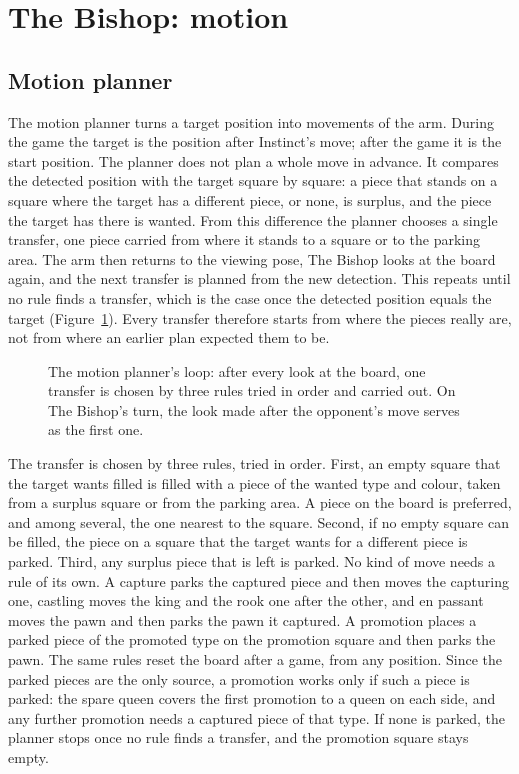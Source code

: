 \section{The Bishop: motion}
\label{sec:bishop-motion}

\subsection{Motion planner}
\label{subsec:motion-planner}

The motion planner turns a target position into movements of the arm.
During the game the target is the position after Instinct's move; after the game it is the start position.
The planner does not plan a whole move in advance.
It compares the detected position with the target square by square: a piece that stands on a square where the target has a different piece, or none, is surplus, and the piece the target has there is wanted.
From this difference the planner chooses a single transfer, one piece carried from where it stands to a square or to the parking area.
The arm then returns to the viewing pose, The Bishop looks at the board again, and the next transfer is planned from the new detection.
This repeats until no rule finds a transfer, which is the case once the detected position equals the target (Figure~\ref{fig:transfer-loop}).
Every transfer therefore starts from where the pieces really are, not from where an earlier plan expected them to be.

\begin{figure}[htbp]
  \centering
  
  \caption{The motion planner's loop: after every look at the board, one transfer is chosen by three rules tried in order and carried out.
    On The Bishop's turn, the look made after the opponent's move serves as the first one.}
  \label{fig:transfer-loop}
\end{figure}

The transfer is chosen by three rules, tried in order.
First, an empty square that the target wants filled is filled with a piece of the wanted type and colour, taken from a surplus square or from the parking area.
A piece on the board is preferred, and among several, the one nearest to the square.
Second, if no empty square can be filled, the piece on a square that the target wants for a different piece is parked.
Third, any surplus piece that is left is parked.
No kind of move needs a rule of its own.
A capture parks the captured piece and then moves the capturing one, castling moves the king and the rook one after the other, and en passant moves the pawn and then parks the pawn it captured.
A promotion places a parked piece of the promoted type on the promotion square and then parks the pawn.
The same rules reset the board after a game, from any position.
Since the parked pieces are the only source, a promotion works only if such a piece is parked: the spare queen covers the first promotion to a queen on each side, and any further promotion needs a captured piece of that type.
If none is parked, the planner stops once no rule finds a transfer, and the promotion square stays empty.

